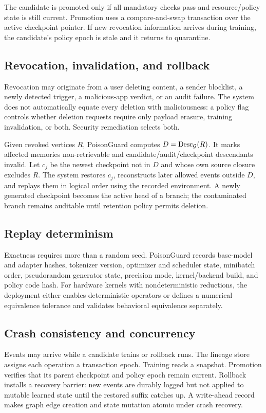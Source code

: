 The candidate is promoted only if all mandatory checks pass and resource/policy state is still current. Promotion uses a compare-and-swap transaction over the active checkpoint pointer. If new revocation information arrives during training, the candidate's policy epoch is stale and it returns to quarantine.

\subsection{Revocation, invalidation, and rollback}

Revocation may originate from a user deleting content, a sender blocklist, a newly detected trigger, a malicious-app verdict, or an audit failure. The system does not automatically equate every deletion with maliciousness: a policy flag controls whether deletion requests require only payload erasure, training invalidation, or both. Security remediation selects both.

Given revoked vertices $R$, PoisonGuard computes $D=\operatorname{Desc}_{\mathcal{G}}(R)$. It marks affected memories non-retrievable and candidate/audit/checkpoint descendants invalid. Let $c_j$ be the newest checkpoint not in $D$ and whose own source closure excludes $R$. The system restores $c_j$, reconstructs later allowed events outside $D$, and replays them in logical order using the recorded environment. A newly generated checkpoint becomes the active head of a branch; the contaminated branch remains auditable until retention policy permits deletion.

\subsection{Replay determinism}

Exactness requires more than a random seed. PoisonGuard records base-model and adapter hashes, tokenizer version, optimizer and scheduler state, minibatch order, pseudorandom generator state, precision mode, kernel/backend build, and policy code hash. For hardware kernels with nondeterministic reductions, the deployment either enables deterministic operators or defines a numerical equivalence tolerance and validates behavioral equivalence separately.

\subsection{Crash consistency and concurrency}

Events may arrive while a candidate trains or rollback runs. The lineage store assigns each operation a transaction epoch. Training reads a snapshot. Promotion verifies that its parent checkpoint and policy epoch remain current. Rollback installs a recovery barrier: new events are durably logged but not applied to mutable learned state until the restored suffix catches up. A write-ahead record makes graph edge creation and state mutation atomic under crash recovery.

